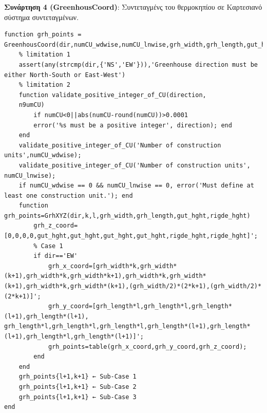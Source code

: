 \documentclass[12pt, a4paper]{report} %
\newcommand{\english}{\foreignlanguage{english}}
\begin{document}
\noindent \textbf{Συνάρτηση 4 (\english{GreenhousCoord})}: Συντεταγμένς του θερμοκηπίου σε Καρτεσιανό σύστημα συντεταγμένων.
\begin{lstlisting}
function grh_points = GreenhousCoord(dir,numCU_wdwise,numCU_lnwise,grh_width,grh_length,gut_hght,rigde_hght)
    % limitation 1
    assert(any(strcmp(dir,{'NS','EW'})),'Greenhouse direction must be either North-South or East-West')
    % limitation 2
    function validate_positive_integer_of_CU(direction,
    n9umCU)
        if numCU<0||abs(numCU-round(numCU))>0.0001
        error('%s must be a positive integer', direction); end
    end
    validate_positive_integer_of_CU('Number of construction units',numCU_wdwise);
    validate_positive_integer_of_CU('Number of construction units', numCU_lnwise);
    if numCU_wdwise == 0 && numCU_lnwise == 0, error('Must define at least one construction unit.'); end
    function grh_points=GrhXYZ(dir,k,l,grh_width,grh_length,gut_hght,rigde_hght)
        grh_z_coord=[0,0,0,0,gut_hght,gut_hght,gut_hght,gut_hght,rigde_hght,rigde_hght]';
        % Case 1
        if dir=='EW'
            grh_x_coord=[grh_width*k,grh_width*(k+1),grh_width*k,grh_width*k+1),grh_width*k,grh_width*(k+1),grh_width*k,grh_width*(k+1),(grh_width/2)*(2*k+1),(grh_width/2)*(2*k+1)]';
            grh_y_coord=[grh_length*l,grh_length*l,grh_length*(l+1),grh_length*(l+1),        grh_length*l,grh_length*l,grh_length*l,grh_length*(l+1),grh_length*(l+1),grh_length*l,grh_length*(l+1)]';
            grh_points=table(grh_x_coord,grh_y_coord,grh_z_coord);
        end
    end
    grh_points{l+1,k+1} ← Sub-Case 1
    grh_points{l+1,k+1} ← Sub-Case 2
    grh_points{l+1,k+1} ← Sub-Case 3
end
\end{lstlisting}
\end{document}
